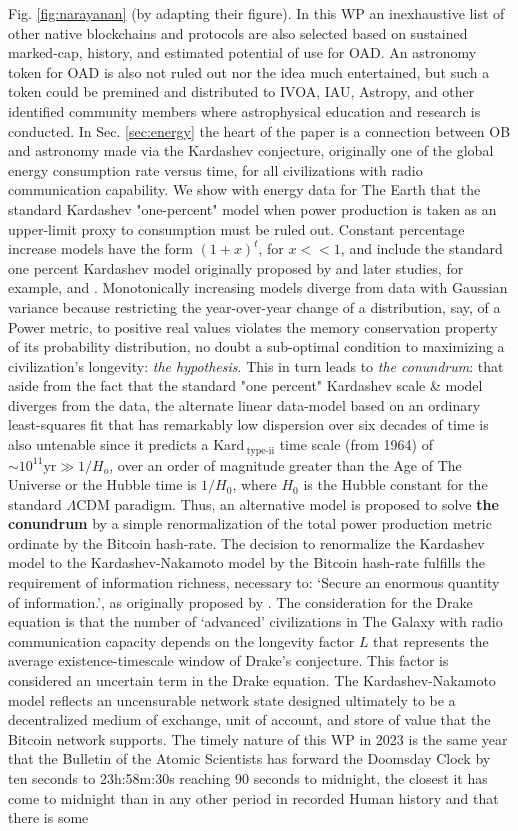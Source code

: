 \documentclass[final,5p,times,twocolumn,authoryear]{elsarticle}
\begin{document}
Fig. \ref{fig:narayanan} (by adapting their figure). In this WP an inexhaustive list of other native blockchains and protocols are also selected based on sustained marked-cap, history, and estimated potential of use for OAD. An astronomy token for OAD is also not ruled out nor the idea much entertained, but such a token could be premined and distributed to IVOA, IAU, Astropy, and other identified community members where astrophysical education and research is conducted. In Sec. \ref{sec:energy} the heart of the paper is a connection between OB and astronomy made via the Kardashev conjecture, originally one of the global energy consumption rate versus time, for all civilizations with radio communication capability. We show with energy data for The Earth that the standard Kardashev "one-percent" model when power production is taken as an upper-limit proxy to consumption must be ruled out. Constant percentage increase models have the form $(1+x)^{t}$, for $x<< 1$, and include the standard one percent Kardashev model originally proposed by \cite{kar64} and later studies, for example, \cite{sagan73} and \cite{gray2020}. Monotonically increasing models diverge from data with Gaussian variance because restricting the year-over-year change of a distribution, say, of a Power metric, to positive real values violates the memory conservation property of its probability distribution, no doubt a sub-optimal condition to maximizing a civilization's longevity: \textit{the hypothesis}. This in turn leads to \textit{the conundrum}: that aside from the fact that the standard "one percent" Kardashev scale \& model diverges from the data, the alternate linear data-model based on an ordinary least-squares fit that has remarkably low dispersion over six decades of time is also untenable since it predicts a Kard$\,_{\textrm{type-ii}}$ time scale (from 1964) of $\sim 10^{11} \textrm{yr} \gg {1/H_o}$, over an order of magnitude greater than the Age of The Universe or the Hubble time is $1/H{_0}$, where $H_{0}$ is the Hubble constant for the standard $\Lambda$CDM paradigm. Thus, an alternative model is proposed to solve \textbf{ the conundrum} by a simple renormalization of the total power production metric ordinate by the Bitcoin hash-rate. The decision to renormalize the Kardashev model to the Kardashev-Nakamoto model by the Bitcoin hash-rate fulfills the requirement of information richness, necessary to: `Secure an enormous quantity of information.', as originally proposed by \cite{kar64}. The consideration for the Drake equation is that the number of `advanced' civilizations in The Galaxy with radio communication capacity depends on the longevity factor $L$ that represents the average existence-timescale window of Drake's conjecture. This factor is considered an uncertain term in the Drake equation. The Kardashev-Nakamoto model reflects an uncensurable network state designed ultimately to be a decentralized medium of exchange, unit of account, and store of value that the Bitcoin network supports. The timely nature of this WP in 2023 is the same year that the Bulletin of the Atomic Scientists has forward the Doomsday Clock by ten seconds to 23h:58m:30s reaching 90 seconds to midnight, the closest it has come to midnight than in any other period in recorded Human history and that there is some 
\end{document}
